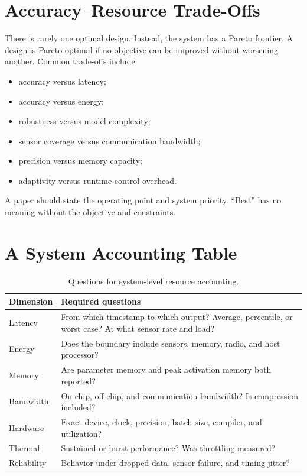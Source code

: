 \section{Accuracy--Resource Trade-Offs}

There is rarely one optimal design. Instead, the system has a Pareto frontier. A design is Pareto-optimal if no objective can be improved without worsening another. Common trade-offs include:

\begin{itemize}
    \item accuracy versus latency;
    \item accuracy versus energy;
    \item robustness versus model complexity;
    \item sensor coverage versus communication bandwidth;
    \item precision versus memory capacity;
    \item adaptivity versus runtime-control overhead.
\end{itemize}

A paper should state the operating point and system priority. ``Best'' has no meaning without the objective and constraints.

\section{A System Accounting Table}

\begin{table}[H]
\centering
\caption{Questions for system-level resource accounting.}
\label{tab:resource-accounting}
\begin{tabularx}{\textwidth}{@{}p{3.2cm}X@{}}
\toprule
\textbf{Dimension} & \textbf{Required questions} \\
\midrule
Latency & From which timestamp to which output? Average, percentile, or worst case? At what sensor rate and load? \\
Energy & Does the boundary include sensors, memory, radio, and host processor? \\
Memory & Are parameter memory and peak activation memory both reported? \\
Bandwidth & On-chip, off-chip, and communication bandwidth? Is compression included? \\
Hardware & Exact device, clock, precision, batch size, compiler, and utilization? \\
Thermal & Sustained or burst performance? Was throttling measured? \\
Reliability & Behavior under dropped data, sensor failure, and timing jitter? \\
\bottomrule
\end{tabularx}
\end{table}

